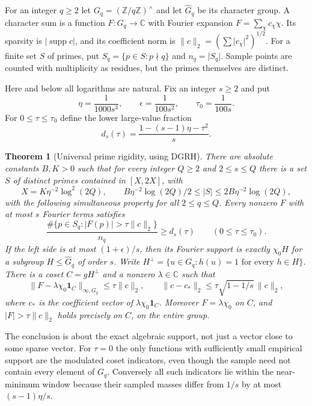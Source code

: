 \documentclass[11pt]{article}
\newtheorem{theorem}{Theorem}[section]
\theoremstyle{definition}\newtheorem{remark}[theorem]{Remark}
\newcommand{\C}{\mathbb C}
\newcommand{\Z}{\mathbb Z}
\newcommand{\supp}{\operatorname{supp}}
\newcommand{\ind}{\mathbf 1}
\newcommand{\abs}[1]{\lvert #1\rvert}
\newcommand{\norm}[1]{\lVert #1\rVert}
\newcommand{\GRH}{\textup{DGRH}}
\begin{document}
For an integer $q\ge2$ let $G_q=(\Z/q\Z)^\times$ and let $\widehat G_q$ be its character group. A character sum is a function $F:G_q\to\C$ with Fourier expansion $F=\sum_\chi c_\chi\chi$. Its sparsity is $\abs{\supp c}$, and its coefficient norm is $\norm{c}_2=(\sum\abs{c_\chi}^2)^{1/2}$. For a finite set $S$ of primes, put $S_q=\{p\in S:p\nmid q\}$ and $n_q=\abs{S_q}$. Sample points are counted with multiplicity as residues, but the primes themselves are distinct.

Here and below all logarithms are natural. Fix an integer $s\ge2$ and put
\begin{equation}\label{eq:constants}
 \eta=\frac1{1000s^3},\qquad \epsilon=\frac1{100s^2},\qquad \tau_0=\frac1{100s}.
\end{equation}
For $0\le \tau\le\tau_0$ define the lower large-value fraction
\begin{equation}\label{eq:lower}
 d_s(\tau)=\frac{1-(s-1)\eta-\tau^2}{s}.
\end{equation}

\begin{theorem}[Universal prime rigidity, using \GRH]\label{thm:main}
There are absolute constants $B,K>0$ such that for every integer $Q\ge2$ and $2\le s\le Q$ there is a set $S$ of distinct primes contained in $[X,2X]$, with
\[
 X=K\eta^{-2}\log^2(2Q),\qquad
 B\eta^{-2}\log(2Q)/2\le\abs S\le 2B\eta^{-2}\log(2Q),
\]
with the following simultaneous property for all $2\le q\le Q$. Every nonzero $F$ with at most $s$ Fourier terms satisfies
\begin{equation}\label{eq:largeset}
 \frac{\#\{p\in S_q:\abs{F(p)}>\tau\norm c_2\}}{n_q}\ge d_s(\tau)
 \qquad(0\le\tau\le\tau_0).
\end{equation}
If the left side is at most $(1+\epsilon)/s$, then its Fourier support is exactly $\chi_0H$ for a subgroup $H\le\widehat G_q$ of order $s$. Write $H^\perp=\{u\in G_q:h(u)=1\text{ for every }h\in H\}$. There is a coset $C=gH^\perp$ and a nonzero $\lambda\in\C$ such that
\begin{equation}\label{eq:stability}
 \norm{F-\lambda\chi_0\ind_C}_{\infty,G_q}\le\tau\norm c_2,
 \qquad
 \norm{c-c_*}_2\le \tau\sqrt{1-1/s}\,\norm c_2,
\end{equation}
where $c_*$ is the coefficient vector of $\lambda\chi_0\ind_C$. Moreover $F=\lambda\chi_0$ on $C$, and $\abs{F}>\tau\norm c_2$ holds precisely on $C$, on the entire group.
\end{theorem}

The conclusion is about the exact algebraic support, not just a vector close to some sparse vector. For $\tau=0$ the only functions with sufficiently small empirical support are the modulated coset indicators, even though the sample need not contain every element of $G_q$. Conversely all such indicators lie within the near-minimum window because their sampled masses differ from $1/s$ by at most $(s-1)\eta/s$.
\end{document}
